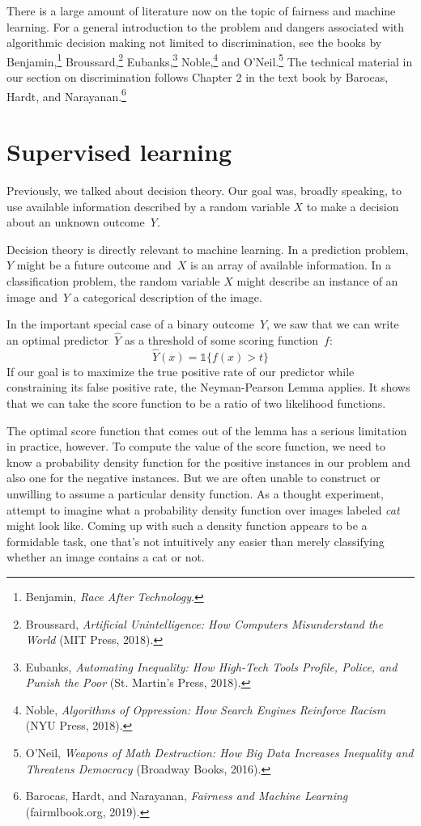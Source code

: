 \documentclass{tufte-book}
\begin{document}
There is a large amount of literature now on the topic of fairness and
machine learning. For a general introduction to the problem and dangers
associated with algorithmic decision making not limited to
discrimination, see the books by Benjamin,\footnote{Benjamin, \emph{Race
  After Technology}.} Broussard,\footnote{Broussard, \emph{Artificial
  Unintelligence: How Computers Misunderstand the World} (MIT Press,
  2018).} Eubanks,\footnote{Eubanks, \emph{Automating Inequality: How
  High-Tech Tools Profile, Police, and Punish the Poor} (St. Martin's
  Press, 2018).} Noble,\footnote{Noble, \emph{Algorithms of Oppression:
  How Search Engines Reinforce Racism} ({NYU} Press, 2018).} and
O'Neil.\footnote{O'Neil, \emph{Weapons of Math Destruction: How Big Data
  Increases Inequality and Threatens Democracy} (Broadway Books, 2016).}
The technical material in our section on discrimination follows Chapter
2 in the text book by Barocas, Hardt, and Narayanan.\footnote{Barocas,
  Hardt, and Narayanan, \emph{Fairness and Machine Learning}
  (fairmlbook.org, 2019).}

\chapter{Supervised learning}

Previously, we talked about decision theory. Our goal was, broadly
speaking, to use available information described by a random variable
\(X\) to make a decision about an unknown outcome~\(Y\).

Decision theory is directly relevant to machine learning. In a
prediction problem,~\(Y\) might be a future outcome and~\(X\) is an
array of available information. In a classification problem, the random
variable \(X\) might describe an instance of an image and~\(Y\) a
categorical description of the image.

In the important special case of a binary outcome~\(Y\), we saw that we
can write an optimal predictor~\(\hat Y\) as a threshold of some scoring
function~\(f\): \[
\hat Y(x) = \mathbb{1}\{f(x) > t\}
\] If our goal is to maximize the true positive rate of our predictor
while constraining its false positive rate, the Neyman-Pearson Lemma
applies. It shows that we can take the score function to be a ratio of
two likelihood functions.

The optimal score function that comes out of the lemma has a serious
limitation in practice, however. To compute the value of the score
function, we need to know a probability density function for the
positive instances in our problem and also one for the negative
instances. But we are often unable to construct or unwilling to assume a
particular density function. As a thought experiment, attempt to imagine
what a probability density function over images labeled \emph{cat} might
look like. Coming up with such a density function appears to be a
formidable task, one that's not intuitively any easier than merely
classifying whether an image contains a cat or not.
\end{document}
